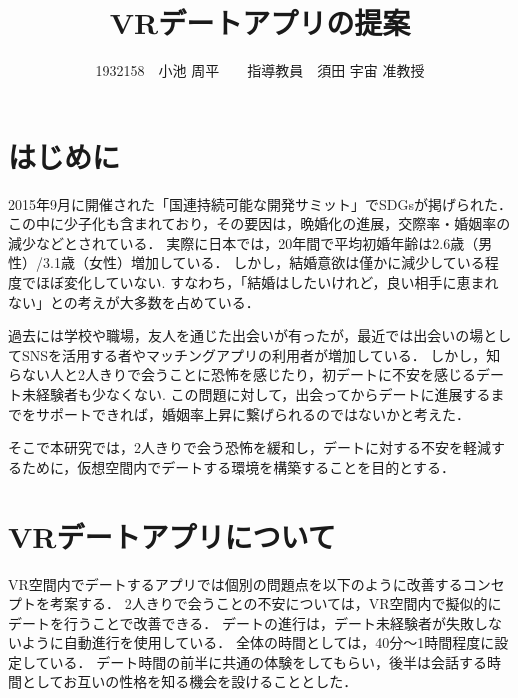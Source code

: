 \documentclass[twocolumn,10pt,a4j]{ltjsarticle}
\title{VRデートアプリの提案}
\author{1932158　小池 周平　　指導教員　須田 宇宙 准教授}
\date{ }
\begin{document}
\maketitle

\section{はじめに}


2015年9月に開催された「国連持続可能な開発サミット」でSDGsが掲げられた．この中に少子化も含まれており，その要因は，晩婚化の進展，交際率・婚姻率の減少\cite{naikakufu2019}などとされている．
実際に日本では，20年間で平均初婚年齢は2.6歳（男性）/3.1歳（女性）増加している．
しかし，結婚意欲は僅かに減少している程度でほぼ変化していない.
すなわち，「結婚はしたいけれど，良い相手に恵まれない」との考えが大多数を占めている\cite{naikakufu2019}．

過去には学校や職場，友人を通じた出会いが有ったが，最近では出会いの場としてSNSを活用する者やマッチングアプリの利用者が増加している．
しかし，知らない人と2人きりで会うことに恐怖を感じたり，初デートに不安を感じるデート未経験者も少なくない\cite{prtimes,yoshimura2020}.
この問題に対して，出会ってからデートに進展するまでをサポートできれば，婚姻率上昇に繋げられるのではないかと考えた．

そこで本研究では，2人きりで会う恐怖を緩和し，デートに対する不安を軽減するために，仮想空間内でデートする環境を構築することを目的とする．





\section{VRデートアプリについて}
VR空間内でデートするアプリでは個別の問題点を以下のように改善するコンセプトを考案する．
2人きりで会うことの不安については，VR空間内で擬似的にデートを行うことで改善できる．
デートの進行は，デート未経験者が失敗しないように自動進行を使用している．
全体の時間としては，40分〜1時間程度に設定している．
デート時間の前半に共通の体験をしてもらい，後半は会話する時間としてお互いの性格を知る機会を設けることとした．
\end{document}
